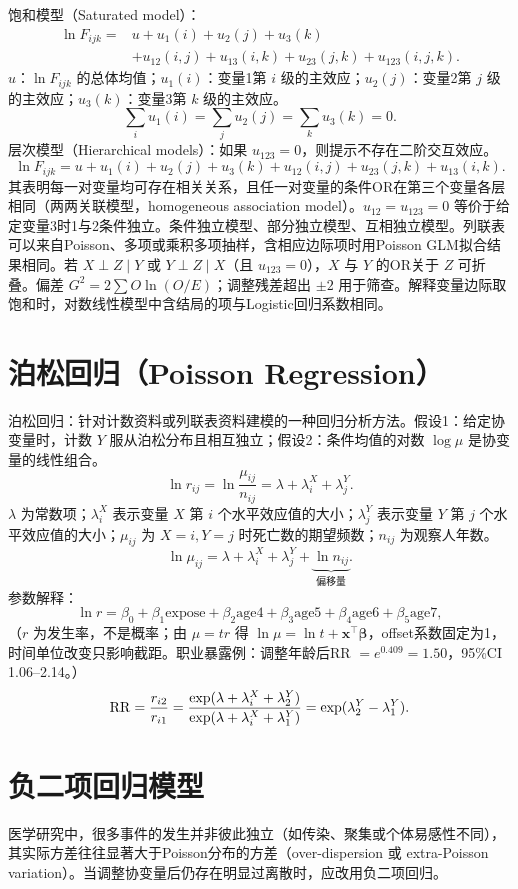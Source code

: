 饱和模型（Saturated model）：
\begin{align*}
\ln F_{ijk}={}&u+u_1(i)+u_2(j)+u_3(k)\\
&+u_{12}(i,j)+u_{13}(i,k)+u_{23}(j,k)+u_{123}(i,j,k).
\end{align*}
$u$：$\ln F_{ijk}$ 的总体均值；$u_1(i)$：变量1第 $i$ 级的主效应；$u_2(j)$：变量2第 $j$ 级的主效应；$u_3(k)$：变量3第 $k$ 级的主效应。
\[
\sum_i u_1(i)=\sum_j u_2(j)=\sum_k u_3(k)=0.
\]
层次模型（Hierarchical models）：如果 $u_{123}=0$，则提示不存在二阶交互效应。
\[
\ln F_{ijk}=u+u_1(i)+u_2(j)+u_3(k)+u_{12}(i,j)+u_{23}(j,k)+u_{13}(i,k).
\]
其表明每一对变量均可存在相关关系，且任一对变量的条件OR在第三个变量各层相同（两两关联模型，homogeneous association model）。$u_{12}=u_{123}=0$ 等价于给定变量3时1与2条件独立。条件独立模型、部分独立模型、互相独立模型。列联表可以来自Poisson、多项或乘积多项抽样，含相应边际项时用Poisson GLM拟合结果相同。若 $X\perp Z\mid Y$ 或 $Y\perp Z\mid X$（且 $u_{123}=0$），$X$ 与 $Y$ 的OR关于 $Z$ 可折叠。偏差 $G^2=2\sum O\ln(O/E)$；调整残差超出 $\pm2$ 用于筛查。解释变量边际取饱和时，对数线性模型中含结局的项与Logistic回归系数相同。
\section{泊松回归（Poisson Regression）}
泊松回归：针对计数资料或列联表资料建模的一种回归分析方法。假设1：给定协变量时，计数 $Y$ 服从泊松分布且相互独立；假设2：条件均值的对数 $\log\mu$ 是协变量的线性组合。
\[
\ln r_{ij}=\ln\frac{\mu_{ij}}{n_{ij}}=\lambda+\lambda_i^X+\lambda_j^Y.
\]
$\lambda$ 为常数项；$\lambda_i^X$ 表示变量 $X$ 第 $i$ 个水平效应值的大小；$\lambda_j^Y$ 表示变量 $Y$ 第 $j$ 个水平效应值的大小；$\mu_{ij}$ 为 $X=i,Y=j$ 时死亡数的期望频数；$n_{ij}$ 为观察人年数。
\[
\ln\mu_{ij}=\lambda+\lambda_i^X+\lambda_j^Y+\underbrace{\ln n_{ij}}_{\text{偏移量}}.
\]
参数解释：
\[
\ln r=\beta_0+\beta_1\mathrm{expose}+\beta_2\mathrm{age4}+\beta_3\mathrm{age5}+\beta_4\mathrm{age6}+\beta_5\mathrm{age7},
\]
（$r$ 为发生率，不是概率；由 $\mu=tr$ 得 $\ln\mu=\ln t+\bm x^\top\bm\beta$，offset系数固定为1，时间单位改变只影响截距。职业暴露例：调整年龄后RR $=e^{0.409}=1.50$，95\%CI 1.06--2.14。）
\[
\operatorname{RR}=\frac{r_{i2}}{r_{i1}}
=\frac{\exp(\lambda+\lambda_i^X+\lambda_2^Y)}{\exp(\lambda+\lambda_i^X+\lambda_1^Y)}
=\exp(\lambda_2^Y-\lambda_1^Y).
\]
\section{负二项回归模型}
医学研究中，很多事件的发生并非彼此独立（如传染、聚集或个体易感性不同），其实际方差往往显著大于Poisson分布的方差（over-dispersion 或 extra-Poisson variation）。当调整协变量后仍存在明显过离散时，应改用负二项回归。

